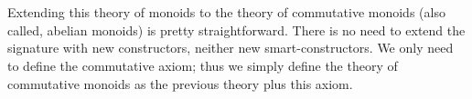 \begin{code}
\>[4]\AgdaSpace{}%
\AgdaSymbol{=}\AgdaSpace{}%
\AgdaSpace{}%
\AgdaSymbol{(}\AgdaSpace{}%
\AgdaSpace{}%
\AgdaSymbol{)}\AgdaSpace{}%
\AgdaSpace{}%
\AgdaSpace{}%
\AgdaSpace{}%
\AgdaSymbol{(}\AgdaSpace{}%
\AgdaSpace{}%
\AgdaSymbol{(}\AgdaSpace{}%
\AgdaSpace{}%
\AgdaSymbol{))}\<%
\\
%
\\[\AgdaEmptyExtraSkip]%
%
\>[4]\AgdaSpace{}%
\AgdaSymbol{=}\AgdaSpace{}%
\AgdaSpace{}%
\AgdaSpace{}%
\AgdaSpace{}%
\AgdaSpace{}%
\AgdaSpace{}%
\<%
\\
%
\\[\AgdaEmptyExtraSkip]%
%
\>[4]\AgdaSpace{}%
\AgdaSymbol{=}\AgdaSpace{}%
\AgdaSpace{}%
\AgdaSpace{}%
\AgdaSpace{}%
\AgdaSpace{}%
\AgdaSpace{}%
\<%
\\
%
\\[\AgdaEmptyExtraSkip]%
%
\>[4]%
\>[15]\AgdaSymbol{:}\AgdaSpace{}%
\AgdaSpace{}%
\AgdaSpace{}%
\AgdaSymbol{(}\AgdaSpace{}%
\AgdaSpace{}%
\AgdaSpace{}%
\AgdaSpace{}%
\AgdaOperator{\AgdaFunction{[}}\AgdaSpace{}%
\AgdaSpace{}%
\AgdaOperator{\AgdaFunction{]}}\AgdaSymbol{)}\<%
\\
%
\>[4]\AgdaSpace{}%
\AgdaSymbol{=}\AgdaSpace{}%
\AgdaSpace{}%
\AgdaSpace{}%
\AgdaSpace{}%
\AgdaSpace{}%
\AgdaSpace{}%
\AgdaSpace{}%
\<%
\end{code}

\noindent
Extending this theory of monoids to the theory of commutative monoids (also
called, abelian monoids) is pretty straightforward. There is no need to extend
the signature with new constructors, neither new smart-constructors. We only
need to define the commutative axiom; thus we simply define the theory of
commutative monoids as the previous theory plus this axiom.

